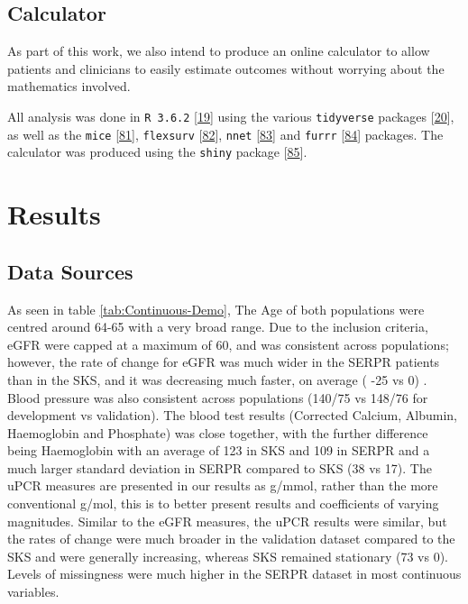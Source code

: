 \documentclass[12pt,PhD,twoside,openright]{muthesis}
\begin{document}
\hypertarget{calculator}{%
\subsection{Calculator}\label{calculator}}

As part of this work, we also intend to produce an online calculator to allow patients and clinicians to easily estimate outcomes without worrying about the mathematics involved.

All analysis was done in \texttt{R\ 3.6.2} {[}\protect\hyperlink{ref-r_core_team_r_nodate}{19}{]} using the various \texttt{tidyverse} packages {[}\protect\hyperlink{ref-wickham_tidy_2017}{20}{]}, as well as the \texttt{mice} {[}\protect\hyperlink{ref-buuren_mice_2011-1}{81}{]}, \texttt{flexsurv} {[}\protect\hyperlink{ref-jackson_flexsurv_nodate}{82}{]}, \texttt{nnet} {[}\protect\hyperlink{ref-ripley_package_2016}{83}{]} and \texttt{furrr} {[}\protect\hyperlink{ref-vaughan_furrr_2018}{84}{]} packages. The calculator was produced using the \texttt{shiny} package {[}\protect\hyperlink{ref-chang_shiny_2020}{85}{]}.

\hypertarget{results-5}{%
\section{Results}\label{results-5}}

\hypertarget{data-sources-1}{%
\subsection{Data Sources}\label{data-sources-1}}

As seen in table \ref{tab:Continuous-Demo}, The Age of both populations were centred around 64-65 with a very broad range. Due to the inclusion criteria, eGFR were capped at a maximum of 60, and was consistent across populations; however, the rate of change for eGFR was much wider in the SERPR patients than in the SKS, and it was decreasing much faster, on average ( -25 vs 0) . Blood pressure was also consistent across populations (140/75 vs 148/76 for development vs validation). The blood test results (Corrected Calcium, Albumin, Haemoglobin and Phosphate) was close together, with the further difference being Haemoglobin with an average of 123 in SKS and 109 in SERPR and a much larger standard deviation in SERPR compared to SKS (38 vs 17). The uPCR measures are presented in our results as g/mmol, rather than the more conventional g/mol, this is to better present results and coefficients of varying magnitudes. Similar to the eGFR measures, the uPCR results were similar, but the rates of change were much broader in the validation dataset compared to the SKS and were generally increasing, whereas SKS remained stationary (73 vs 0). Levels of missingness were much higher in the SERPR dataset in most continuous variables.
\end{document}
